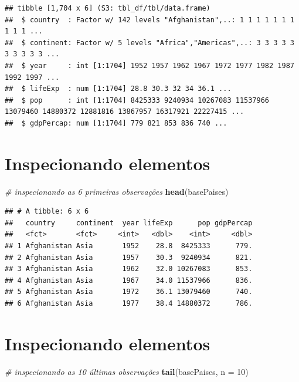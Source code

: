 \documentclass[
]{article}
\newenvironment{Shaded}{\begin{snugshade}}{\end{snugshade}}
\newcommand{\CommentTok}[1]{\textcolor[rgb]{0.56,0.35,0.01}{\textit{#1}}}
\newcommand{\DataTypeTok}[1]{\textcolor[rgb]{0.13,0.29,0.53}{#1}}
\newcommand{\DecValTok}[1]{\textcolor[rgb]{0.00,0.00,0.81}{#1}}
\newcommand{\KeywordTok}[1]{\textcolor[rgb]{0.13,0.29,0.53}{\textbf{#1}}}
\newcommand{\NormalTok}[1]{#1}
\begin{document}
\begin{verbatim}
## tibble [1,704 x 6] (S3: tbl_df/tbl/data.frame)
##  $ country  : Factor w/ 142 levels "Afghanistan",..: 1 1 1 1 1 1 1 1 1 1 ...
##  $ continent: Factor w/ 5 levels "Africa","Americas",..: 3 3 3 3 3 3 3 3 3 3 ...
##  $ year     : int [1:1704] 1952 1957 1962 1967 1972 1977 1982 1987 1992 1997 ...
##  $ lifeExp  : num [1:1704] 28.8 30.3 32 34 36.1 ...
##  $ pop      : int [1:1704] 8425333 9240934 10267083 11537966 13079460 14880372 12881816 13867957 16317921 22227415 ...
##  $ gdpPercap: num [1:1704] 779 821 853 836 740 ...
\end{verbatim}

\hypertarget{inspecionando-elementos}{%
\section{Inspecionando elementos}\label{inspecionando-elementos}}

\begin{Shaded}
\begin{Highlighting}[]
\CommentTok{# inspecionando as 6 primeiras observações }
\KeywordTok{head}\NormalTok{(basePaises)}
\end{Highlighting}
\end{Shaded}

\begin{verbatim}
## # A tibble: 6 x 6
##   country     continent  year lifeExp      pop gdpPercap
##   <fct>       <fct>     <int>   <dbl>    <int>     <dbl>
## 1 Afghanistan Asia       1952    28.8  8425333      779.
## 2 Afghanistan Asia       1957    30.3  9240934      821.
## 3 Afghanistan Asia       1962    32.0 10267083      853.
## 4 Afghanistan Asia       1967    34.0 11537966      836.
## 5 Afghanistan Asia       1972    36.1 13079460      740.
## 6 Afghanistan Asia       1977    38.4 14880372      786.
\end{verbatim}

\hypertarget{inspecionando-elementos-1}{%
\section{Inspecionando elementos}\label{inspecionando-elementos-1}}

\begin{Shaded}
\begin{Highlighting}[]
\CommentTok{# inspecionando as 10 últimas observações}
\KeywordTok{tail}\NormalTok{(basePaises, }\DataTypeTok{n =} \DecValTok{10}\NormalTok{)}
\end{Highlighting}
\end{Shaded}
\end{document}
